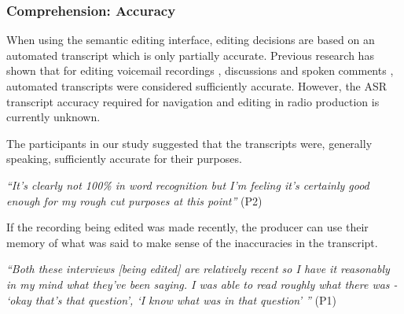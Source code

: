 





\subsubsection{Comprehension: Accuracy}
When using the semantic editing interface, editing decisions are based on an
automated transcript which is only partially accurate. Previous research has shown that for editing
voicemail recordings \citep{Whittaker2004}, discussions \citep{Sivaraman2016} and spoken comments \citep{Yoon2014},
automated transcripts were considered sufficiently accurate. However, the ASR transcript accuracy required for
navigation and editing in radio production is currently unknown.

The participants in our study suggested that the transcripts were, generally speaking, sufficiently accurate for their
purposes.

\textit{``It's clearly not 100\% in word recognition but I'm feeling it's
  certainly good enough for my rough cut purposes at this point''} (P2)

If the recording being edited was made recently, the producer can use their
memory of what was said to make sense of the inaccuracies in the
transcript.

\textit{``Both these interviews [being edited] are relatively recent so I have
  it reasonably in my mind what they've been saying. I was able to read roughly
  what there was - `okay that's that question', `I know what was in that
  question' ''} (P1)

